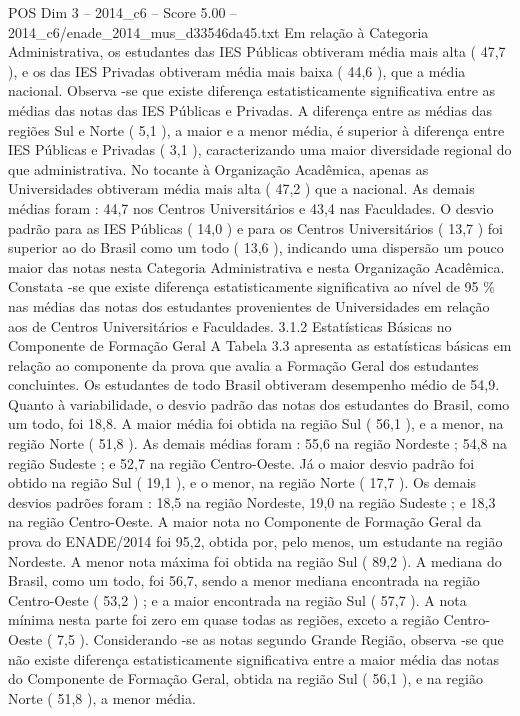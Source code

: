 \begin{textsample}{POS Dim 3 – 2014\_c6 – Score 5.00 – 2014\_c6/enade\_2014\_mus\_d33546da45.txt}
Em relação à Categoria Administrativa, os estudantes das IES Públicas obtiveram média mais alta ( 47,7 ), e os das IES Privadas obtiveram média mais baixa ( 44,6 ), que a média nacional.
Observa -se que existe diferença estatisticamente significativa entre as médias das notas das IES Públicas e Privadas.
A diferença entre as médias das regiões Sul e Norte ( 5,1 ), a maior e a menor média, é superior à diferença entre IES Públicas e Privadas ( 3,1 ), caracterizando uma maior diversidade regional do que administrativa.
No tocante à Organização Acadêmica, apenas as Universidades obtiveram média mais alta ( 47,2 ) que a nacional.
As demais médias foram : 44,7 nos Centros Universitários e 43,4 nas Faculdades.
O desvio padrão para as IES Públicas ( 14,0 ) e para os Centros Universitários ( 13,7 ) foi superior ao do Brasil como um todo ( 13,6 ), indicando uma dispersão um pouco maior das notas nesta Categoria Administrativa e nesta Organização Acadêmica.
Constata -se que existe diferença estatisticamente significativa ao nível de 95 \% nas médias das notas dos estudantes provenientes de Universidades em relação aos de Centros Universitários e Faculdades. 3.1.2 Estatísticas Básicas no Componente de Formação Geral A Tabela 3.3 apresenta as estatísticas básicas em relação ao componente da prova que avalia a Formação Geral dos estudantes concluintes.
Os estudantes de todo Brasil obtiveram desempenho médio de 54,9.
Quanto à variabilidade, o desvio padrão das notas dos estudantes do Brasil, como um todo, foi 18,8.
A maior média foi obtida na região Sul ( 56,1 ), e a menor, na região Norte ( 51,8 ).
As demais médias foram : 55,6 na região Nordeste ; 54,8 na região Sudeste ; e 52,7 na região Centro-Oeste.
Já o maior desvio padrão foi obtido na região Sul ( 19,1 ), e o menor, na região Norte ( 17,7 ).
Os demais desvios padrões foram : 18,5 na região Nordeste, 19,0 na região Sudeste ; e 18,3 na região Centro-Oeste.
A maior nota no Componente de Formação Geral da prova do ENADE/2014 foi 95,2, obtida por, pelo menos, um estudante na região Nordeste.
A menor nota máxima foi obtida na região Sul ( 89,2 ).
A mediana do Brasil, como um todo, foi 56,7, sendo a menor mediana encontrada na região Centro-Oeste ( 53,2 ) ; e a maior encontrada na região Sul ( 57,7 ).
A nota mínima nesta parte foi zero em quase todas as regiões, exceto a região Centro-Oeste ( 7,5 ).
Considerando -se as notas segundo Grande Região, observa -se que não existe diferença estatisticamente significativa entre a maior média das notas do Componente de Formação Geral, obtida na região Sul ( 56,1 ), e na região Norte ( 51,8 ), a menor média.

\end{textsample}
